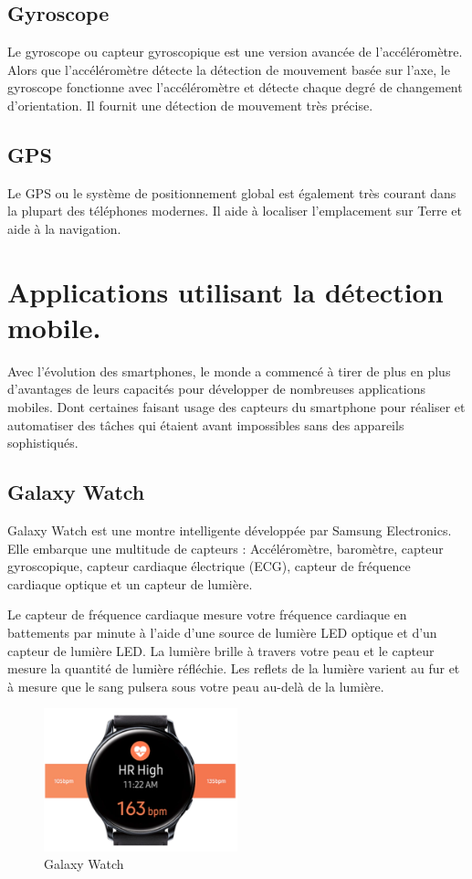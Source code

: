 \subsection{Gyroscope}
Le gyroscope ou capteur gyroscopique est une version avancée de l'accéléromètre. Alors que l'accéléromètre détecte la détection de mouvement basée sur l'axe, le gyroscope fonctionne avec l'accéléromètre et détecte chaque degré de changement d'orientation. Il fournit une détection de mouvement très précise.

\subsection{GPS}
Le GPS ou le système de positionnement global est également très courant dans la plupart des téléphones modernes. Il aide à localiser l'emplacement sur Terre et aide à la navigation.

\section{Applications utilisant la détection mobile.}
Avec l'évolution des smartphones, le monde a commencé à tirer de plus en plus d'avantages de leurs capacités pour développer de nombreuses applications mobiles. Dont certaines faisant usage des capteurs du smartphone pour réaliser et automatiser des tâches qui étaient avant impossibles sans des appareils sophistiqués.
\subsection{Galaxy Watch}
Galaxy Watch est une montre intelligente développée par Samsung Electronics. Elle embarque une multitude de capteurs : Accéléromètre, baromètre, capteur gyroscopique, capteur cardiaque électrique (ECG), capteur de fréquence cardiaque optique et un capteur de lumière.

Le capteur de fréquence cardiaque mesure votre fréquence cardiaque en battements par minute à l'aide d'une source de lumière LED optique et d'un capteur de lumière LED. La lumière brille à travers votre peau et le capteur mesure la quantité de lumière réfléchie. Les reflets de la lumière varient au fur et à mesure que le sang pulsera sous votre peau au-delà de la lumière.
\begin{figure}[h!]
    \center
    \includegraphics[width=0.5\textwidth]{Images/chapter1/galaxyWatch.PNG}
    \caption{Galaxy Watch}
    \label{fig:Application}
\end{figure}
